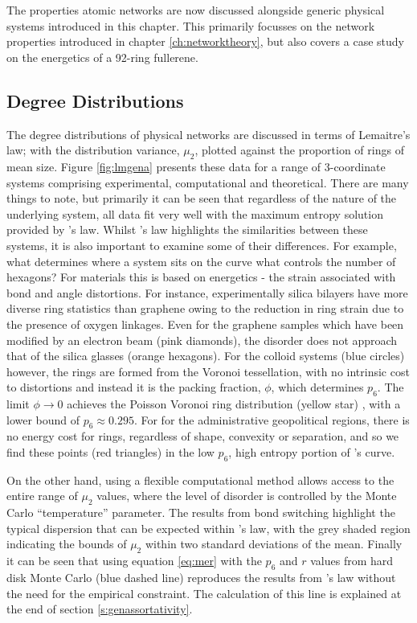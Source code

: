 The properties \td{} atomic networks are now discussed alongside generic physical systems introduced in this chapter.
This primarily focusses on the network properties introduced in chapter \ref{ch:networktheory}, but also covers a case study on the energetics of a 92\--ring fullerene.

\subsection{Degree Distributions}
\label{s:gendegreedist}

The degree distributions of physical networks are discussed in terms of Lemaitre's law; with the distribution variance, $\mu_2$, plotted against the proportion of rings of mean size.
Figure \ref{fig:lmgena} presents these data for a range of 3\--coordinate systems comprising experimental, computational and theoretical.
There are many things to note, but primarily it can be seen that regardless of the nature of the underlying system, all data fit very well with the maximum entropy solution provided by \lm{}'s law.
Whilst \lm's law highlights the similarities between these systems, it is also important to examine some of their differences. For example, what determines where a system sits on the \lm{} curve \ie{} what controls the number of hexagons?
For materials this is based on energetics \-- the strain associated with bond and angle distortions. For instance, experimentally silica bilayers have more diverse ring statistics than graphene owing to the reduction in ring strain due to the presence of oxygen linkages\cite{Buchner2017}.
Even for the graphene samples which have been modified by an electron beam (pink diamonds), the disorder does not approach that of the silica glasses (orange hexagons).
For the colloid systems (blue circles) however, the rings are formed from the Voronoi tessellation, with no intrinsic cost to distortions and instead it is the packing fraction, $\phi$, which determines $p_6$.
The limit $\phi\rightarrow 0$ achieves the Poisson Voronoi ring distribution (yellow star) \cite{Tanemura2003}, with a lower bound of $p_6 \approx 0.295$.
For for the administrative geopolitical regions, there is no energy cost for rings, regardless of shape, convexity or separation, and so we find these points (red triangles) in the low $p_6$, high entropy portion of \lm's{} curve.

On the other hand, using a flexible computational method allows access to the entire range of $\mu_2$ values, where the level of disorder is controlled by the Monte Carlo ``temperature'' parameter.
The results from bond switching highlight the typical dispersion that can be expected within \lm's{} law, with the grey shaded region indicating the bounds of $\mu_2$ within two standard deviations of the mean.
Finally it can be seen that using equation \eqref{eq:mer} with the $p_6$ and $r$ values from hard disk Monte Carlo (blue dashed line) reproduces the results from \lm's{} law without the need for the empirical constraint.
The calculation of this line is explained at the end of section \ref{s:genassortativity}.


